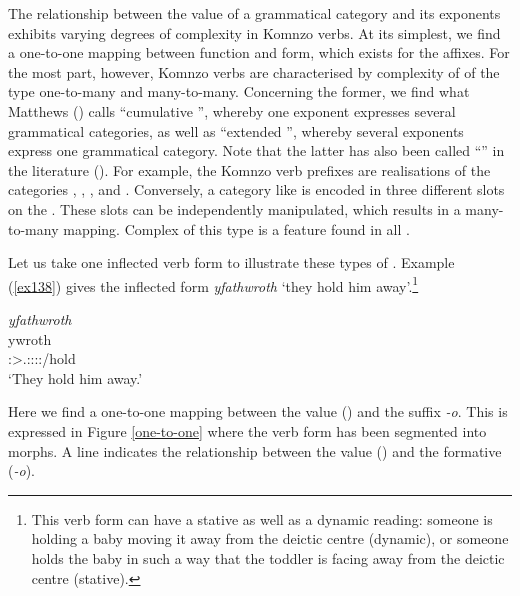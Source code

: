 The relationship between the value of a grammatical category and its exponents exhibits varying degrees of complexity in Komnzo verbs. At its simplest, we find a one-to-one mapping between function and form, which exists for the  affixes. For the most part, however, Komnzo verbs are characterised by complexity of  of the type one-to-many and many-to-many. Concerning the former, we find what Matthews (\citeyear[147-149]{Matthews:1979vm}) calls ``cumulative '', whereby one exponent expresses several grammatical categories, as well as ``extended '', whereby several exponents express one grammatical category. Note that the latter has also been called ``'' in the literature (\citealt[163]{Caballero:2012vr}). For example, the Komnzo verb prefixes are  realisations of the categories , , ,  and . Conversely, a category like  is encoded in three different slots on the . These slots can be independently manipulated, which results in a many-to-many mapping. Complex  of this type is a feature found in all .

Let us take one inflected verb form to illustrate these types of . Example (\ref{ex138}) gives the inflected  form \emph{yfathwroth} `they hold him away'.\footnote{This verb form can have a stative as well as a dynamic reading: someone is holding a baby moving it away from the deictic centre (dynamic), or someone holds the baby in such a way that the toddler is facing away from the deictic centre (stative). }

\begin{exe}
	\ex \emph{yfathwroth}\\
	\gll ywroth\\
	\Stpl:\Sbj>\Tsg.\Masc:\Obj:\Nonpast:\Ipfv:\Andat/hold\\
	\trans `They hold him away.'
	\label{ex138}
\end{exe}

Here we find a one-to-one mapping between the  value () and the suffix \emph{-o}. This is expressed in Figure \ref{one-to-one} where the verb form has been segmented into morphs. A line indicates the  relationship between the value (\Andat) and the formative (\emph{-o}).

